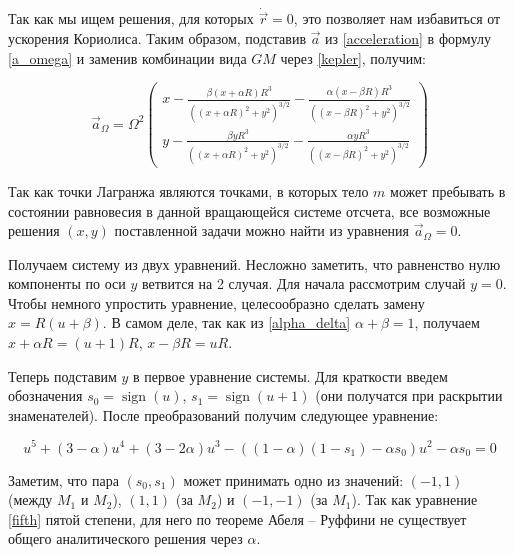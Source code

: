 \documentclass[12pt]{article}
\DeclareMathOperator{\sign}{sign}
\begin{document}
    Так как мы ищем решения, для которых $\dot{\vec{r}} = 0$, это
    позволяет нам избавиться от ускорения Кориолиса. Таким образом, подставив 
    $\vec{a}$ из \ref{acceleration} в формулу \ref{a_omega} и заменив
    комбинации вида $GM$ через \ref{kepler}, получим:

    \begin{equation}
        \vec{a}_{\Omega} = \Omega^2
        \begin{pmatrix}
            x - \frac{\beta (x + \alpha R)R^3}{((x + \alpha R)^2 + y^2)^{3/2}} - 
            \frac{\alpha (x - \beta R)R^3}{((x - \beta R)^2 + y^2)^{3/2}} \\
            y - \frac{\beta y R^3}{((x + \alpha R)^2 + y^2)^{3/2}} - 
            \frac{\alpha y R^3}{((x - \beta R)^2 + y^2)^{3/2}}
        \end{pmatrix}
    \end{equation}

    \par Так как точки Лагранжа являются точками, в которых тело $m$ может пребывать в 
    состоянии равновесия в данной вращающейся системе отсчета, все возможные решения
    $(x,y)$ поставленной задачи можно найти из уравнения $\vec{a}_{\Omega} = 0$.

    \par Получаем систему из двух уравнений. Несложно заметить, что равненство
    нулю компоненты по оси $y$ ветвится на 2 случая. Для начала рассмотрим 
    случай $y = 0$. Чтобы немного упростить уравнение, 
    целесообразно сделать замену $x = R(u + \beta)$. В самом деле, так как
    из \ref{alpha_delta} $\alpha + \beta = 1$, получаем $x + \alpha R = (u + 1)R$,
    $x - \beta R = uR$. 
    
    \par Теперь подставим $y$ в первое уравнение системы. Для краткости
    введем обозначения $s_0 = \sign(u)$, $s_1 = \sign(u + 1)$ (они получатся
    при раскрытии знаменателей). После преобразований получим следующее уравнение:

    \begin{equation}
        u^5 + (3 - \alpha)u^4 + (3 - 2\alpha)u^3 - ((1-\alpha)(1 - s_1) - 
        \alpha s_0)u^2 - \alpha s_0 = 0
        \label{fifth}
    \end{equation}

    \par Заметим, что пара $(s_0, s_1)$ может принимать одно из значений:
    $(-1, 1)$ (между $M_1$ и $M_2$), $(1, 1)$ (за $M_2$) и $(-1, -1)$ (за $M_1$). 
    Так как уравнение \ref{fifth} пятой степени,
    для него по теореме Абеля -- Руффини \cite{alexeev} не существует общего аналитического решения
    через $\alpha$. 
\end{document}
